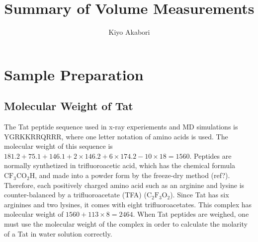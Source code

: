 \documentclass[letterpaper,12pt]{article}
\author{Kiyo Akabori}
\title{Summary of Volume Measurements}
\begin{document}



\section{Sample Preparation}
\subsection{Molecular Weight of Tat}
The Tat peptide sequence used in x-ray experiements and MD simulations is 
YGRKKRRQRRR, where one letter notation of amino acids is used. The molecular 
weight of this sequence is 
$181.2+75.1+146.1+2 \times 146.2+6\times 174.2-10\times 18=1560$.
Peptides are normally synthetized in trifluoroacetic acid, which has 
the chemical formula $\mathrm{CF_3CO_2H}$, and made into a powder form by the 
freeze-dry method (ref?). Therefore, each positively charged amino acid such as 
an arginine and lysine is counter-balanced by a trifluoroacetate (TFA)
($\mathrm{C_2F_3O_2}$). Since Tat has six arginines and two lysines, it comes 
with eight trifluoroacetates. This complex has molecular weight of 
$1560+113\times 8=2464$. When Tat peptides are weighed, one must use the 
molecular weight of the complex in order to calculate the molarity of a Tat
in water solution correctly.
\end{document}
